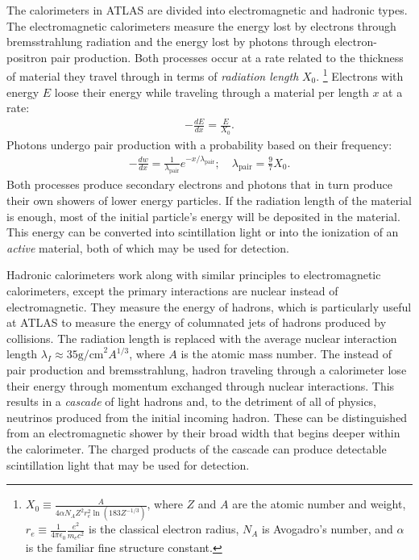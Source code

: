 The calorimeters in ATLAS are divided into electromagnetic and hadronic types.
The electromagnetic calorimeters measure the energy lost by electrons through bremsstrahlung radiation and the energy lost by photons through electron-positron pair production.
Both processes occur at a rate related to the thickness of material they travel through in terms of \emph{radiation length} $X_0$.
\footnote{$X_0\equiv\frac{A}{4\alpha N_AZ^2r_e^2\ln(183Z^{-1/3})}$, where $Z$ and $A$ are the atomic number and weight, $r_e\equiv\frac{1}{4\pi\epsilon_0}\frac{e^2}{m_ec^2}$ is the classical electron radius, $N_A$ is Avogadro's number, and $\alpha$ is the familiar fine structure constant.}
Electrons with energy $E$ loose their energy while traveling through a material per length $x$ at a rate:
\begin{equation}\begin{split}
    -\frac{dE}{dx}=\frac{E}{X_0}.
\end{split}\end{equation}
Photons undergo pair production with a probability based on their frequency:
\begin{equation}\begin{split}
    -\frac{dw}{dx}=\frac{1}{\lambda_\text{pair}}e^{-x/\lambda_\text{pair}}; \quad \lambda_\text{pair}=\frac{9}{7}X_0.
\end{split}\end{equation}
Both processes produce secondary electrons and photons that in turn produce their own showers of lower energy particles.
If the radiation length of the material is enough, most of the initial particle's energy will be deposited in the material.
This energy can be converted into scintillation light or into the ionization of an \emph{active} material, both of which may be used for detection.
\cite{grupen}

Hadronic calorimeters work along with similar principles to electromagnetic calorimeters, except the primary interactions are nuclear instead of electromagnetic.
They measure the energy of hadrons, which is particularly useful at ATLAS to measure the energy of columnated jets of hadrons produced by collisions.
The radiation length is replaced with the average nuclear interaction length $\lambda_I\approx35\text{g/cm}^2A^{1/3}$, where $A$ is the atomic mass number.
The instead of pair production and bremsstrahlung, hadron traveling through a calorimeter lose their energy through momentum exchanged through nuclear interactions.
This results in a \emph{cascade} of light hadrons and, to the detriment of all of physics, neutrinos produced from the initial incoming hadron.
These can be distinguished from an electromagnetic shower by their broad width that begins deeper within the calorimeter.
The charged products of the cascade can produce detectable scintillation light that may be used for detection.
\cite{grupen}


